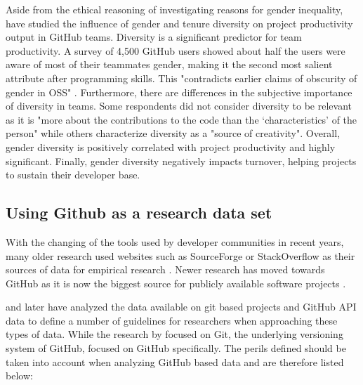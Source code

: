 Aside from the ethical reasoning of investigating reasons for gender inequality, \citeauthor{Vasilescu:2015:GTD:2702123.2702549} have studied the influence of gender and tenure diversity on project productivity output in GitHub teams. Diversity is a significant predictor for team productivity. A survey of 4,500 GitHub users showed about half the users were aware of most of their teammates gender, making it the second most salient attribute after programming skills. This "contradicts earlier claims of obscurity of gender in OSS" \cite{Vasilescu:2015:GTD:2702123.2702549}. Furthermore, there are differences in the subjective importance of diversity in teams. Some respondents did not consider diversity to be relevant as it is "more about the contributions to the code than the ‘characteristics’ of the person" while others characterize diversity as a "source of creativity". Overall, gender diversity is positively correlated with project productivity and highly significant. Finally, gender diversity negatively impacts turnover, helping projects to sustain their developer base.


\subsection{Using Github as a research data set}

With the changing of the tools used by developer communities in recent years, many older research used websites such as SourceForge or StackOverflow as their sources of data for empirical research \cite{vasilescu:2012:6542459,doi:10.1287/mnsc.1060.0550}. Newer research has moved towards GitHub as it is now the biggest source for publicly available software projects \cite{Vasilescu:2015:GTD:2702123.2702549}.

\citeauthor{perils-ms-research:2009} and later \citeauthor{perils-github:2015} have analyzed the data available on git based projects and GitHub \ac{API} data to define a number of guidelines for researchers when approaching these types of data. While the research by \citeauthor{perils-ms-research:2009} focused on Git, the underlying versioning system of GitHub, \citeauthor{perils-github:2015} focused on GitHub specifically. The perils defined should be taken into account when analyzing GitHub based data and are therefore listed below:


